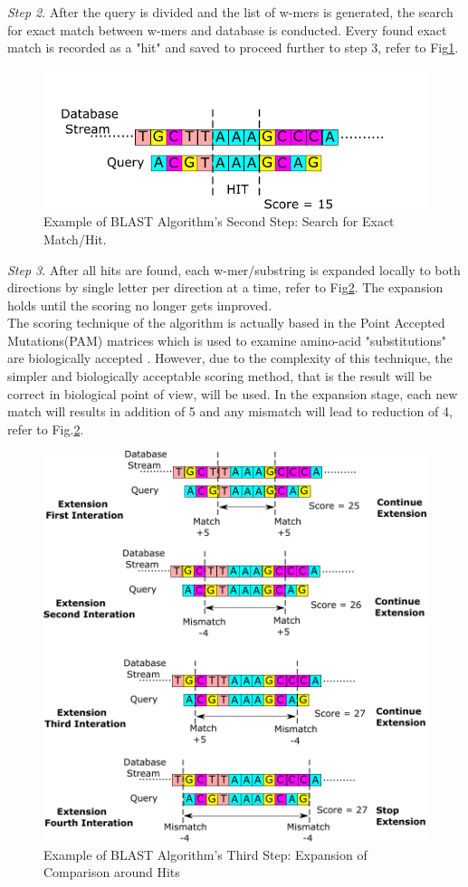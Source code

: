 \textit{Step 2}. After the query is divided and the list of w-mers is generated, the search for exact match between w-mers and database is conducted. Every found exact match is recorded as a "hit" and saved to proceed further to step 3, refer to Fig\ref{fig:step2}. 

\begin{figure}
\includegraphics[width=\textwidth]{Figures/Algorithm2.pdf}
\caption{Example of BLAST Algorithm's Second Step: Search for Exact Match/Hit.} \label{fig:step2}
\end{figure}

\textit{Step 3}. After all hits are found, each w-mer/substring is expanded locally to both directions by single letter per direction at a time, refer to Fig\ref{fig:step3}. The expansion holds until the scoring no longer gets improved.
\\

The scoring technique of the algorithm is actually based in the Point Accepted Mutations(PAM) matrices which is used to examine amino-acid "substitutions" are biologically accepted \cite{sotiriades2007design}. However, due to the complexity of this technique, the simpler and biologically acceptable scoring method, that is the result will be correct in biological point of view, will be used. In the expansion stage, each new match will results in addition of 5 and any mismatch will lead to reduction of 4, refer to Fig.\ref{fig:step3}.

\begin{figure}
\includegraphics[width=\textwidth]{Figures/Algorithm3.pdf}
\caption{Example of BLAST Algorithm's Third Step: Expansion of Comparison around Hits} \label{fig:step3}
\end{figure}
